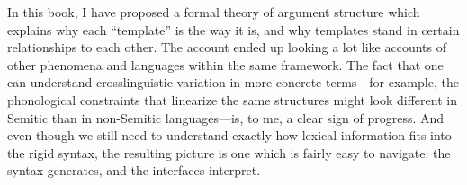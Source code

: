 In this book, I have proposed a formal theory of argument structure which explains why each ``template'' is the way it is, and why templates stand in certain relationships to each other. The account ended up looking a lot like accounts of other phenomena and languages within the same framework. The fact that one can understand crosslinguistic variation in more concrete terms---for example, the phonological constraints that linearize the same structures might look different in Semitic than in non-Semitic languages---is, to me, a clear sign of progress. And even though we still need to understand exactly how lexical information fits into the rigid syntax, the resulting picture is one which is fairly easy to navigate: the syntax generates, and the interfaces interpret.